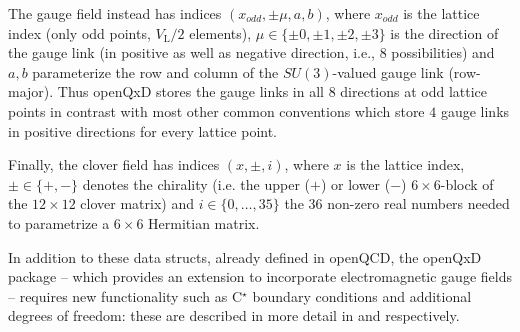 The gauge field instead has indices $(x_{odd}, \pm \mu, a, b)$, where $x_{odd}$ is the lattice index (only odd points, $V_\mathrm{L}/2$ elements), $\mu \in \{\pm 0, \pm 1, \pm 2, \pm 3\}$ is the direction of the gauge link (in positive as well as negative direction, i.e., 8 possibilities) and $a,b$ parameterize the row and column of the $SU(3)$-valued gauge link (row-major). Thus openQxD stores the gauge links in all $8$ directions at odd lattice points in contrast with most other common conventions which store $4$ gauge links in positive directions for every lattice point.

Finally, the clover field has indices $(x, \pm, i)$, where $x$ is the lattice index, $\pm \in \{+, -\}$ denotes the chirality (i.e. the upper ($+$) or lower ($-$) $6 \times 6$-block of the $12 \times 12$ clover matrix) and $i \in \{0, \dots, 35\}$ the $36$ non-zero real numbers needed to parametrize a $6 \times 6$ Hermitian matrix.

In addition to these data structs, already defined in openQCD, the openQxD package --
which provides an extension to incorporate electromagnetic gauge fields --
requires new functionality such as C$^\star$ boundary conditions
and additional degrees of freedom: these are described in more detail in
 and respectively.
